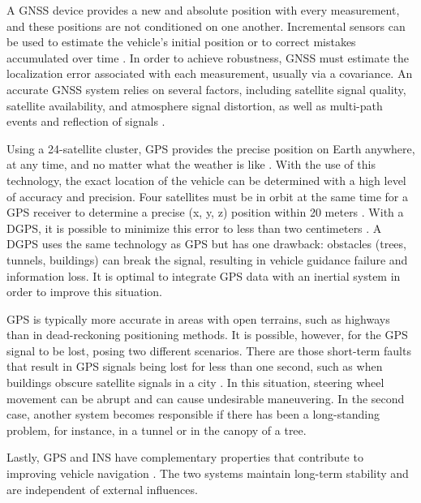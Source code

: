 \documentclass[a4paper,12pt]{article}
\begin{document}
\begin{itemize}
\hspace{5mm} A GNSS device provides a new and absolute position with every measurement, and these positions are not conditioned on one another. Incremental sensors can be used to estimate the vehicle's initial position or to correct mistakes accumulated over time \cite{article28}. In order to achieve robustness, GNSS must estimate the localization error associated with each measurement, usually via a covariance. An accurate GNSS system relies on several factors, including satellite signal quality, satellite availability, and atmosphere signal distortion, as well as multi-path events and reflection of signals \cite{article28}.

\hspace{5mm} Using a 24-satellite cluster, GPS provides the precise position on Earth anywhere, at any time, and no matter what the weather is like \cite{article29}. With the use of this technology, the exact location of the vehicle can be determined with a high level of accuracy and precision. Four satellites must be in orbit at the same time for a GPS receiver to determine a precise (x, y, z) position within 20 meters \cite{article29}. With a DGPS, it is possible to minimize this error to less than two centimeters \cite{article29}. A DGPS uses the same technology as GPS but has one drawback: obstacles (trees, tunnels, buildings) can break the signal, resulting in vehicle guidance failure and information loss. It is optimal to integrate GPS data with an inertial system in order to improve this situation.

\hspace{5mm} GPS is typically more accurate in areas with open terrains, such as highways than in dead-reckoning positioning methods. It is possible, however, for the GPS signal to be lost, posing two different scenarios. There are those short-term faults that result in GPS signals being lost for less than one second, such as when buildings obscure satellite signals in a city \cite{article29}. In this situation, steering wheel movement can be abrupt and can cause undesirable maneuvering. In the second case, another system becomes responsible if there has been a long-standing problem, for instance, in a tunnel or in the canopy of a tree.

\hspace{5mm} Lastly, GPS and INS have complementary properties that contribute to improving vehicle navigation \cite{article29}. The two systems maintain long-term stability and are independent of external influences.



\end{itemize}
\end{document}
